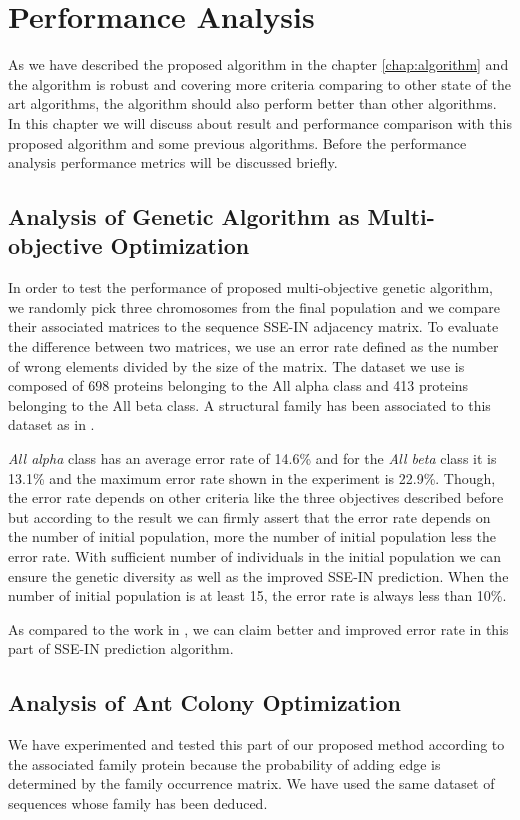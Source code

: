 \chapter {Performance Analysis}
\label{chap:result}
As we have described the proposed algorithm in the chapter \ref{chap:algorithm} and the algorithm is robust and covering more criteria comparing to other state of the art algorithms, the algorithm should also perform better than other algorithms. In this chapter we will discuss about result and performance comparison with this proposed algorithm and some previous algorithms. Before the performance analysis performance metrics will be discussed briefly.
\section{Analysis of Genetic Algorithm as Multi-objective Optimization}
In order to test the performance of proposed multi-objective genetic algorithm, we randomly pick three chromosomes from the final population and we compare their associated matrices to the sequence SSE-IN adjacency matrix. To evaluate the difference between two matrices, we use an error rate defined as the number of wrong elements divided by the size of the matrix. The dataset we use is composed of 698 proteins belonging to the All alpha class and 413 proteins belonging to the All beta class. A structural family has been associated to this dataset as in \cite{gaci2010build}. 

\textit{All alpha} class has an average error rate of 14.6\% and for the \textit{All beta} class it is 13.1\% and the maximum error rate shown in the experiment is 22.9\%. Though, the error rate depends on other criteria like the three objectives described before but according to the result we can firmly assert that the error rate depends on the number of initial population, more the number of initial population less the error rate. With sufficient number of individuals in the initial population we can ensure the genetic diversity as well as the improved SSE-IN prediction. When the number of initial population is at least 15, the error rate is always less than 10\%.

As compared to the work in \cite{gaci2010}, we can claim better and improved error rate in this part of SSE-IN prediction algorithm.

\section {Analysis of Ant Colony Optimization}
We have experimented and tested this part of our proposed method according to the associated family protein because the probability of adding edge is determined by the family occurrence matrix. We have used the same dataset of sequences whose family has been deduced.

